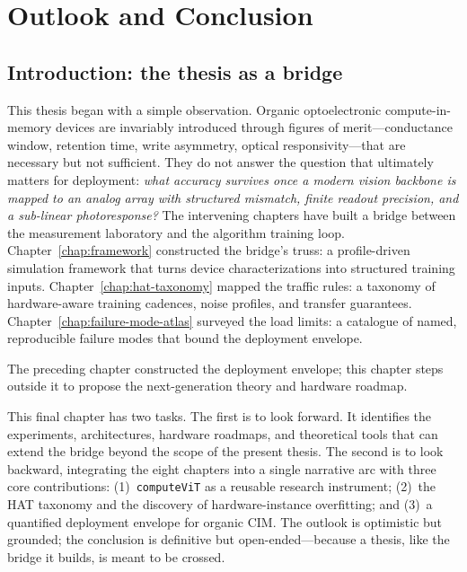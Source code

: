 %
%

\chapter{Outlook and Conclusion}
\label{chap:outlook}

\section{Introduction: the thesis as a bridge}

This thesis began with a simple observation.  Organic optoelectronic compute-in-memory devices are invariably introduced through figures of merit---conductance window, retention time, write asymmetry, optical responsivity---that are necessary but not sufficient.  They do not answer the question that ultimately matters for deployment: \emph{what accuracy survives once a modern vision backbone is mapped to an analog array with structured mismatch, finite readout precision, and a sub-linear photoresponse?}  The intervening chapters have built a bridge between the measurement laboratory and the algorithm training loop.  Chapter~\ref{chap:framework} constructed the bridge's truss: a profile-driven simulation framework that turns device characterizations into structured training inputs.  Chapter~\ref{chap:hat-taxonomy} mapped the traffic rules: a taxonomy of hardware-aware training cadences, noise profiles, and transfer guarantees.  Chapter~\ref{chap:failure-mode-atlas} surveyed the load limits: a catalogue of named, reproducible failure modes that bound the deployment envelope.

The preceding chapter constructed the deployment envelope; this chapter steps outside it to propose the next-generation theory and hardware roadmap.

This final chapter has two tasks.  The first is to look forward.  It identifies the experiments, architectures, hardware roadmaps, and theoretical tools that can extend the bridge beyond the scope of the present thesis.  The second is to look backward, integrating the eight chapters into a single narrative arc with three core contributions: (1)~\texttt{compute\-ViT} as a reusable research instrument; (2)~the HAT taxonomy and the discovery of hardware-instance overfitting; and (3)~a quantified deployment envelope for organic CIM.  The outlook is optimistic but grounded; the conclusion is definitive but open-ended---because a thesis, like the bridge it builds, is meant to be crossed.



